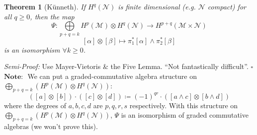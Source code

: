 \documentclass[10pt]{article}
\theoremstyle{plain}
\newtheorem{theorem}{Theorem}[section]
\theoremstyle{definition}
\newenvironment{semiproof}{\textit{Semi-Proof:}}{\hfill$\square$}
\newcommand{\Note}{\textbf{Note: }}
\newcommand{\man}{\mathcal{M}}
\newcommand{\nan}{\mathcal{N}}
\newcommand{\cohomman}[1]{H^{#1}(\man)}
\newcommand{\cohomnan}[1]{H^{#1}(\nan)}
\newcommand{\cohom}[2]{H^{#1}(#2)}
\begin{document}
\begin{theorem}[K\"unneth]
If $\cohomnan{q}$ is finite dimensional (e.g. $\nan$ compact) for all $q \geq 0$, then the map
$$\Psi : \bigoplus\limits_{p+q = k} \cohomman{p} \otimes \cohomnan{q} \to \cohom{p+q}{\man \times \nan}$$
$$[\alpha] \otimes [\beta] \mapsto \pi_1^*[\alpha] \wedge \pi_2^* [\beta]$$ %
is an isomorphism $\forall k \geq 0$.
\end{theorem}
\begin{semiproof}
Use Mayer-Vietoris \& the Five Lemma. ``Not fantastically difficult''.
\end{semiproof}\\
$\Note$ We can put a graded-commutative algebra structure on $\bigoplus\limits_{p+q=k}\left(\cohomman{p} \otimes \cohomnan{q}\right)$:
$$([a]\otimes[b]) \cdot ([c]\otimes[d]) \coloneqq (-1)^{qr} \cdot \left([a\wedge c]\otimes [b\wedge d]\right)$$
where the degrees of $a,b,c,d$ are $p,q,r,s$ respectively. With this structure on$\bigoplus\limits_{p+q=k}\left(\cohomman{p} \otimes \cohomnan{q}\right)$, $\Psi$ is an isomorphism of graded commutative algebras (we won't prove this).
\end{document}

